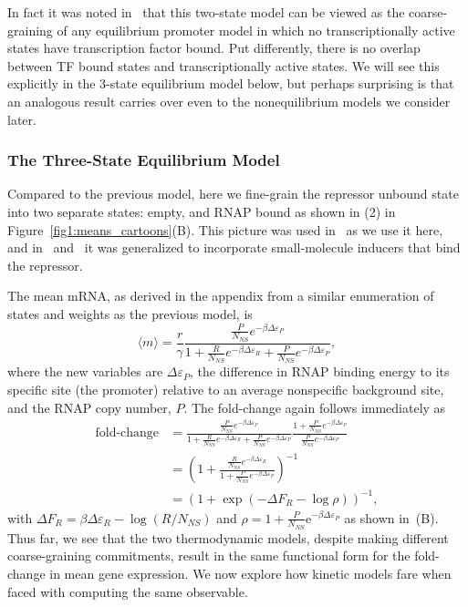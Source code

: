In fact it was noted in~\cite{Chure2019} that this two-state model can be viewed
as the coarse-graining of any equilibrium promoter model in which no
transcriptionally active states have transcription factor bound. Put
differently, there is no overlap between TF bound states and transcriptionally
active states. We will see this explicitly in the 3-state equilibrium model
below, but perhaps surprising is that an analogous result carries over even to
the nonequilibrium models we consider later.

\subsubsection{The Three-State Equilibrium Model}
Compared to the previous model, here we fine-grain the repressor unbound state
into two separate states: empty, and RNAP bound as shown in (2) in
Figure~\ref{fig1:means_cartoons}(B). This picture was used in~\cite{Garcia2011a}
as we use it here, and in~\cite{Razo-Mejia2018} and~\cite{Chure2019} it was
generalized to incorporate small-molecule inducers that bind the repressor. 

The mean mRNA, as derived in the appendix from a similar enumeration of states
and weights as the previous model, is
\begin{equation}
\langle m \rangle = \frac{r}{\gamma}
\frac{\frac{P}{N_{NS}} e^{-\beta\Delta\varepsilon_P}}
        {
        1 + \frac{R}{N_{NS}} e^{-\beta\Delta\varepsilon_R}
        + \frac{P}{N_{NS}} e^{-\beta\Delta\varepsilon_P}
        },
\end{equation}
where the new variables are $\Delta\varepsilon_P$, the difference in RNAP
binding energy to its specific site (the promoter) relative to an average
nonspecific background site, and the RNAP copy number, $P$. The fold-change
again follows immediately as
\begin{align}
\text{fold-change}
&= \frac{\frac{P}{N_{NS}} e^{-\beta\Delta\varepsilon_P}}
        {
        1 + \frac{R}{N_{NS}} e^{-\beta\Delta\varepsilon_R}
        + \frac{P}{N_{NS}} e^{-\beta\Delta\varepsilon_P}
        }
\frac{1 + \frac{P}{N_{NS}} e^{-\beta\Delta\varepsilon_P}}
        {\frac{P}{N_{NS}} e^{-\beta\Delta\varepsilon_P}}
\\
&= \left(
1 + \frac{\frac{R}{N_{NS}} e^{-\beta\Delta\varepsilon_R}}
        {1 + \frac{P}{N_{NS}} e^{-\beta\Delta\varepsilon_P}}
\right)^{-1}
\\
&= (1 + \exp(-\Delta F_R - \log\rho))^{-1},
\end{align}
with $\Delta F_R = \beta\Delta\varepsilon_R - \log(R/N_{NS})$ and $\rho = 1 +
\frac{P}{N_{NS}}\mathrm{e}^{-\beta\Delta\varepsilon_P}$ as shown
in~(B). Thus far, we see that the two thermodynamic
models, despite making different coarse-graining commitments, result in the same
functional form for the fold-change in mean gene expression.  We now explore how
kinetic models fare when faced with computing the same observable.

